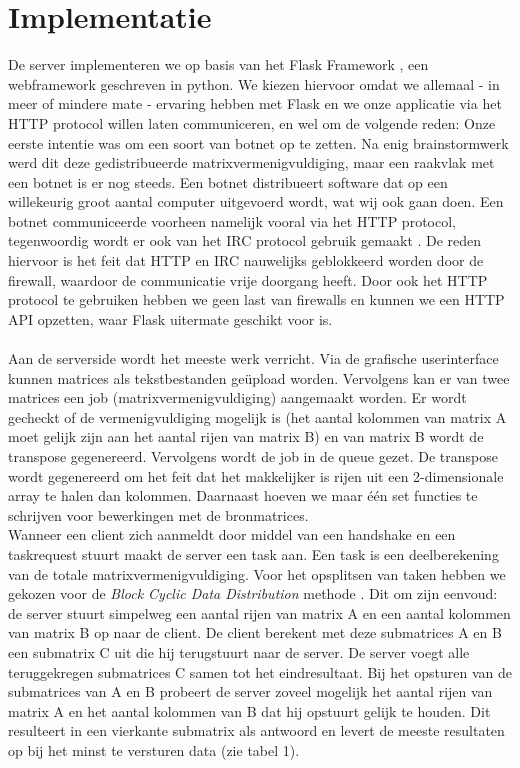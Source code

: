 \documentclass[11pt]{article}
\begin{document}
\section{Implementatie}
De server implementeren we op basis van het Flask Framework \cite{flask}, een webframework
geschreven in python. We kiezen hiervoor omdat we allemaal - in meer of mindere mate -
ervaring hebben met Flask en we onze applicatie via het HTTP protocol willen laten communiceren,
en wel om de volgende reden:
Onze eerste intentie was om een soort van botnet op te zetten. Na enig brainstormwerk werd dit
deze gedistribueerde matrixvermenigvuldiging, maar een raakvlak met een botnet is er nog steeds.
Een botnet distribueert software dat op een willekeurig groot aantal computer uitgevoerd wordt,
wat wij ook gaan doen. Een botnet communiceerde voorheen namelijk vooral via het
HTTP protocol,
tegenwoordig wordt er ook van het IRC protocol gebruik gemaakt \cite{rajab06}. De reden
hiervoor is het feit dat HTTP en IRC nauwelijks geblokkeerd worden door de firewall, waardoor
de communicatie vrije doorgang heeft. Door ook het HTTP protocol te gebruiken hebben we geen
last van firewalls en kunnen we een HTTP API opzetten, waar Flask uitermate geschikt voor is.\\
\\
Aan de serverside wordt het meeste werk verricht. Via de grafische userinterface kunnen
matrices als tekstbestanden ge\"{u}pload worden. Vervolgens kan er van twee matrices een
job (matrixvermenigvuldiging) aangemaakt worden. Er wordt gecheckt of de vermenigvuldiging
mogelijk is (het aantal kolommen van matrix A moet gelijk zijn aan het aantal rijen van matrix
B) en van matrix B wordt de transpose gegenereerd. Vervolgens wordt de job in de queue gezet.
De transpose wordt gegenereerd om het feit dat het makkelijker is rijen uit een 2-dimensionale
array te halen dan kolommen. Daarnaast hoeven we maar \'{e}\'{e}n set functies te schrijven
voor bewerkingen met de bronmatrices.\\
Wanneer een client zich aanmeldt door middel van een handshake en een taskrequest stuurt maakt
de server een task aan. Een task is een deelberekening van de totale matrixvermenigvuldiging.
Voor het opsplitsen van taken hebben we gekozen voor de \emph{Block Cyclic Data Distribution}
methode \cite[2.2]{choi97}. Dit om zijn eenvoud: de server stuurt simpelweg een aantal rijen
van matrix A en een aantal kolommen van matrix B op naar de client. De client berekent met
deze submatrices A en B een submatrix C uit die hij terugstuurt naar de server. De server
voegt alle teruggekregen submatrices C samen tot het eindresultaat. Bij het opsturen van de
submatrices van A en B probeert de server zoveel mogelijk het aantal rijen van matrix A en het
aantal kolommen van B dat hij opstuurt gelijk te houden. Dit resulteert in een vierkante
submatrix als antwoord en levert de meeste resultaten op bij het minst te versturen data (zie
tabel 1).
\end{document}
